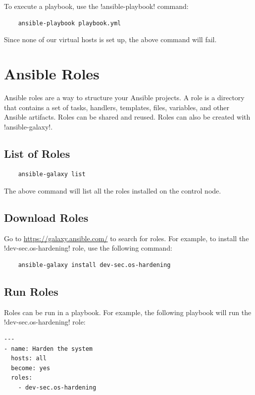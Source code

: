\documentclass{article}
\begin{document}
To execute a playbook, use the \mono!ansible-playbook! command:

\begin{verbatim}
    ansible-playbook playbook.yml
\end{verbatim}

Since none of our virtual hosts is set up, the above command will fail. 

\section{Ansible Roles}

Ansible roles are a way to structure your Ansible projects. A role is a
directory that contains a set of tasks, handlers, templates, files, variables,
and other Ansible artifacts. Roles can be shared and reused. Roles can also be
created with \mono!ansible-galaxy!.

\subsection{List of Roles}

\begin{verbatim}
    ansible-galaxy list
\end{verbatim}

The above command will list all the roles installed on the control node.

\subsection{Download Roles}

Go to \url{https://galaxy.ansible.com/} to search for roles. For example, to
install the \mono!dev-sec.os-hardening! role, use the following command:

\begin{verbatim}
    ansible-galaxy install dev-sec.os-hardening
\end{verbatim}

\subsection{Run Roles}

Roles can be run in a playbook. For example, the following playbook will run the
\mono!dev-sec.os-hardening! role:

\begin{verbatim}
---
- name: Harden the system
  hosts: all
  become: yes
  roles:
    - dev-sec.os-hardening
\end{verbatim}
\end{document}

